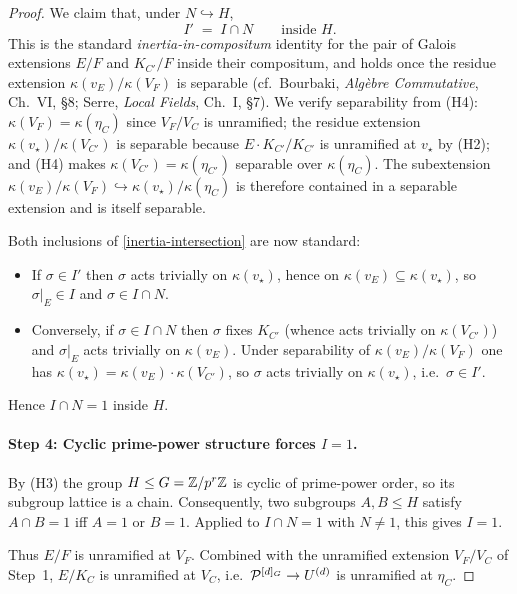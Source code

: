 \documentclass[11pt]{article}
\begin{document}
\begin{proof}
We claim that, under $N \hookrightarrow H$,
\begin{equation}\label{eq:inertia-intersection}
I' \;=\; I \cap N \qquad \text{inside } H .
\end{equation}
This is the standard \emph{inertia-in-compositum} identity for the pair of
Galois extensions $E/F$ and $K_{C'}/F$ inside their compositum, and holds
once the residue extension $\kappa(v_E)/\kappa(V_F)$ is separable
(cf.\ Bourbaki, \emph{Algèbre Commutative}, Ch.~VI, \S8; Serre,
\emph{Local Fields}, Ch.~I, \S7).
We verify separability from (H4):
$\kappa(V_F) = \kappa(\eta_C)$ since $V_F/V_C$ is unramified; the residue
extension $\kappa(v_\star)/\kappa(V_{C'})$ is separable because
$E \cdot K_{C'}/K_{C'}$ is unramified at $v_\star$ by (H2); and (H4) makes
$\kappa(V_{C'}) = \kappa(\eta_{C'})$ separable over $\kappa(\eta_C)$.
The subextension $\kappa(v_E)/\kappa(V_F) \hookrightarrow
\kappa(v_\star)/\kappa(\eta_C)$ is therefore contained in a separable
extension and is itself separable.

Both inclusions of \eqref{inertia-intersection} are now standard:
\begin{itemize}
\item If $\sigma \in I'$ then $\sigma$ acts trivially on $\kappa(v_\star)$,
      hence on $\kappa(v_E) \subseteq \kappa(v_\star)$, so $\sigma|_E \in I$
      and $\sigma \in I \cap N$.
\item Conversely, if $\sigma \in I \cap N$ then $\sigma$ fixes $K_{C'}$
      (whence acts trivially on $\kappa(V_{C'})$) and $\sigma|_E$ acts
      trivially on $\kappa(v_E)$.  Under separability of
      $\kappa(v_E)/\kappa(V_F)$ one has
      $\kappa(v_\star) = \kappa(v_E) \cdot \kappa(V_{C'})$, so $\sigma$
      acts trivially on $\kappa(v_\star)$, i.e.\ $\sigma \in I'$.
\end{itemize}
Hence $I \cap N = 1$ inside $H$.

\paragraph{Step 4: Cyclic prime-power structure forces $I = 1$.}
By (H3) the group $H \leq G = \mathbb{Z}/p^r\mathbb{Z}$ is cyclic of prime-power order, so
its subgroup lattice is a chain.  Consequently, two subgroups
$A, B \leq H$ satisfy $A \cap B = 1$ iff $A = 1$ or $B = 1$.  Applied to
$I \cap N = 1$ with $N \neq 1$, this gives $I = 1$.

Thus $E/F$ is unramified at $V_F$.  Combined with the unramified extension
$V_F/V_C$ of Step~1, $E/K_C$ is unramified at $V_C$, i.e.\ $\mathcal{P}^{[d]_G}\to
U^{(d)}$ is unramified at $\eta_C$.
\end{proof}
\end{document}
